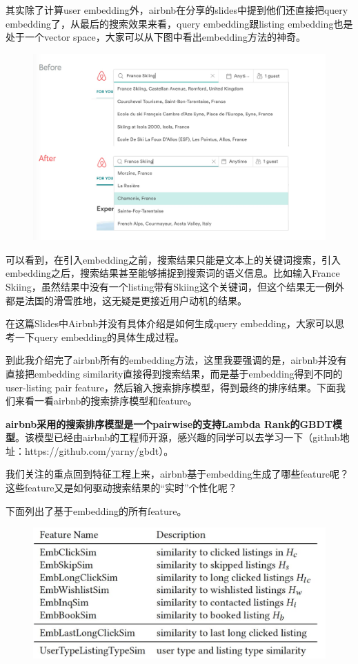\documentclass[12pt]{article}
\begin{document}
其实除了计算user embedding外，airbnb在分享的slides中提到他们还直接把query embedding了，从最后的搜索效果来看，query embedding跟listing embedding也是处于一个vector space，大家可以从下图中看出embedding方法的神奇。
\begin{figure}[H]
    \centering
    \includegraphics[width=1\textwidth]{fig/Airbnb_Search_Embedding.jpg}
\end{figure}

可以看到，在引入embedding之前，搜索结果只能是文本上的关键词搜索，引入embedding之后，搜索结果甚至能够捕捉到搜索词的语义信息。比如输入France Skiing，虽然结果中没有一个listing带有Skiing这个关键词，但这个结果无一例外都是法国的滑雪胜地，这无疑是更接近用户动机的结果。

在这篇Slides中Airbnb并没有具体介绍是如何生成query embedding，大家可以思考一下query embedding的具体生成过程。

到此我介绍完了airbnb所有的embedding方法，这里我要强调的是，airbnb并没有直接把embedding similarity直接得到搜索结果，而是基于embedding得到不同的user-listing pair feature，然后输入搜索排序模型，得到最终的排序结果。下面我们来看一看airbnb的搜索排序模型和feature。

\textbf{airbnb采用的搜索排序模型是一个pairwise的支持Lambda Rank的GBDT模型}。该模型已经由airbnb的工程师开源，感兴趣的同学可以去学习一下（github地址：https://github.com/yarny/gbdt）。

我们关注的重点回到特征工程上来，airbnb基于embedding生成了哪些feature呢？这些feature又是如何驱动搜索结果的“实时”个性化呢？

下面列出了基于embedding的所有feature。
\begin{figure}[H]
    \centering
    \includegraphics[width=1\textwidth]{fig/Airbnb_Embedding_Features.png}
\end{figure}
\end{document}
